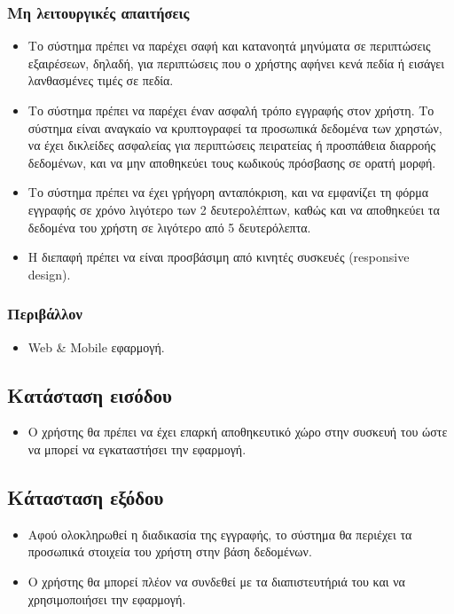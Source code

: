 \documentclass[12pt,a4paper,twoside]{book}
\begin{document}
\subsubsection{Μη λειτουργικές απαιτήσεις}
\begin{itemize}
  \item Το σύστημα πρέπει να παρέχει σαφή και κατανοητά μηνύματα σε περιπτώσεις εξαιρέσεων, δηλαδή, για περιπτώσεις που ο χρήστης αφήνει κενά πεδία ή εισάγει λανθασμένες τιμές σε πεδία.%
  \item Το σύστημα πρέπει να παρέχει έναν ασφαλή τρόπο εγγραφής στον χρήστη. Το σύστημα είναι αναγκαίο να κρυπτογραφεί τα προσωπικά δεδομένα των χρηστών, να έχει δικλείδες ασφαλείας για περιπτώσεις πειρατείας ή προσπάθεια διαρροής δεδομένων, και να μην αποθηκεύει τους κωδικούς πρόσβασης σε ορατή μορφή. %
  \item Το σύστημα πρέπει να έχει γρήγορη ανταπόκριση, και να εμφανίζει τη φόρμα εγγραφής σε χρόνο λιγότερο των 2 δευτερολέπτων, καθώς και να αποθηκεύει τα δεδομένα του χρήστη σε λιγότερο από 5 δευτερόλεπτα. %
  \item Η διεπαφή πρέπει να είναι προσβάσιμη από κινητές συσκευές (responsive design). %
\end{itemize}

\subsubsection{Περιβάλλον}
\begin{itemize}
  \item Web \& Mobile εφαρμογή.
\end{itemize}

\subsection{Κατάσταση εισόδου} %
\begin{itemize}
  \item Ο χρήστης θα πρέπει να έχει επαρκή αποθηκευτικό χώρο στην συσκευή του ώστε να μπορεί να εγκαταστήσει την εφαρμογή.%
\end{itemize}

\subsection{Κάτασταση εξόδου} %
\begin{itemize}
  \item Αφού ολοκληρωθεί η διαδικασία της εγγραφής, το σύστημα θα περιέχει τα προσωπικά στοιχεία του χρήστη στην βάση δεδομένων.%
  \item Ο χρήστης θα μπορεί πλέον να συνδεθεί με τα διαπιστευτήριά του και να χρησιμοποιήσει την εφαρμογή. %
\end{itemize}
\end{document}
